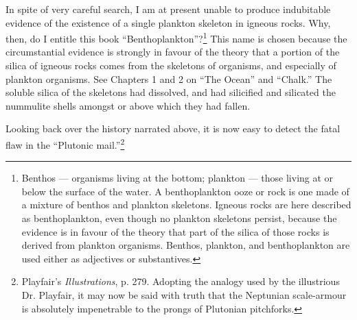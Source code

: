 \documentclass[a4paper, 12pt, oneside]{article}
\begin{document}
In spite of very careful search, I am at present unable to produce indubitable evidence of the existence of a single plankton skeleton in igneous rocks. Why, then, do I entitle this book ``Benthoplankton''?\footnote{Benthos --- organisms living at the bottom; plankton --- those living at or below the surface of the water. A benthoplankton ooze or rock is one made of a mixture of benthos and plankton skeletons. Igneous rocks are here described as benthoplankton, even though no plankton skeletons persist, because the evidence is in favour of the theory that part of the silica of those rocks is derived from plankton organisms. Benthos, plankton, and benthoplankton are used either as adjectives or substantives.} This name is chosen because the circumstantial evidence is strongly in favour of the theory that a portion of the silica of igneous rocks comes from the skeletons of organisms, and especially of plankton organisms. See Chapters 1 and 2 on ``The Ocean'' and ``Chalk.'' The soluble silica of the skeletons had dissolved, and had silicified and silicated the nummulite shells amongst or above which they had fallen.

Looking back over the history narrated above, it is now easy to detect the fatal flaw in the ``Plutonic mail.''\footnote{Playfair's \emph{Illustrations}, p. 279. Adopting the analogy used by the illustrious Dr. Playfair, it may now be said with truth that the Neptunian scale-armour is absolutely impenetrable to the prongs of Plutonian pitchforks.}
\end{document}
